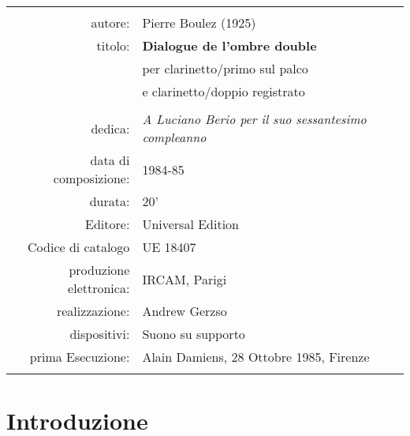 \begin{table}[ht]
\begin{center}
\begin{tabular}{>{\sffamily}r>{\normalsize }p{7.5cm}}

\hline
\hline
											& \\
autore:										& Pierre Boulez (1925) \\
titolo:										& \textbf{Dialogue de l'ombre double} \\
											& \textsf{per clarinetto/primo sul palco} \\
											& \textsf{e clarinetto/doppio registrato} \\
											& \\
dedica:										& \emph{A Luciano Berio per il suo sessantesimo compleanno} \\
data di composizione:						& 1984-85 \\
durata:										& 20' \\
Editore:									& Universal Edition \\
Codice di catalogo							& UE 18407 \\
produzione elettronica:						& IRCAM, Parigi \\
realizzazione:								& Andrew Gerzso \\
dispositivi:								& Suono su supporto \\
prima Esecuzione:							& Alain Damiens, 28 Ottobre 1985, Firenze \\
											& \\
\hline
\hline

\end{tabular}
\end{center}
\end{table}%



\section*{Introduzione}

